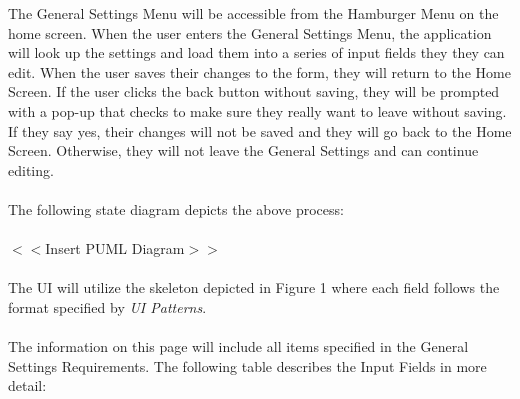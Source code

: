 \documentclass{scrreprt}
\begin{document}
The General Settings Menu will be accessible from the Hamburger Menu on the home screen.  When the user enters the General Settings Menu, the application will look up the settings and load them into a series of input fields they they can edit.  When the user saves their changes to the form, they will return to the Home Screen.  If the user clicks the back button without saving, they will be prompted with a pop-up that checks to make sure they really want to leave without saving.  If they say yes, their changes will not be saved and they will go back to the Home Screen.  Otherwise, they will not leave the General Settings and can continue editing.
\\\\
The following state diagram depicts the above process:
\\\\
$<$$<$Insert PUML Diagram$>$$>$
\\\\
The UI will utilize the skeleton depicted in Figure 1 where each field follows the format specified by \textit{UI Patterns}.
\\\\
The information on this page will include all items specified in the General Settings Requirements.  The following table describes the Input Fields in more detail:
\end{document}
